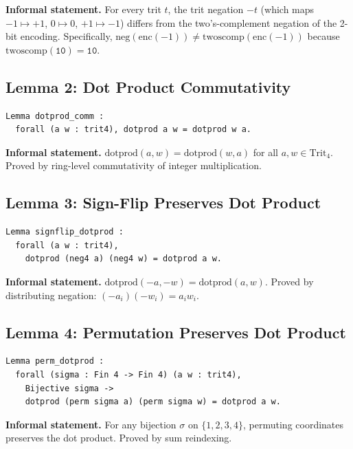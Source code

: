 \noindent\textbf{Informal statement.} For every trit \(t\), the trit
negation \(-t\) (which maps \(-1\mapsto+1\), \(0\mapsto 0\),
\(+1\mapsto-1\)) differs from the two's-complement negation of the
2-bit encoding.  Specifically, \(\mathrm{neg}(\mathrm{enc}(-1)) \neq
\mathrm{twoscomp}(\mathrm{enc}(-1))\) because
\(\mathrm{twoscomp}(\mathtt{10}) = \mathtt{10}\).

\subsection{Lemma 2: Dot Product Commutativity}
\label{lem:dotprod_comm}

\begin{verbatim}
Lemma dotprod_comm :
  forall (a w : trit4), dotprod a w = dotprod w a.
\end{verbatim}

\noindent\textbf{Informal statement.}
\(\mathrm{dotprod}(a,w) = \mathrm{dotprod}(w,a)\) for all
\(a,w \in \mathrm{Trit}_4\).  Proved by ring-level commutativity of
integer multiplication.

\subsection{Lemma 3: Sign-Flip Preserves Dot Product}
\label{lem:signflip_dotprod}

\begin{verbatim}
Lemma signflip_dotprod :
  forall (a w : trit4),
    dotprod (neg4 a) (neg4 w) = dotprod a w.
\end{verbatim}

\noindent\textbf{Informal statement.}
\(\mathrm{dotprod}(-a,-w) = \mathrm{dotprod}(a,w)\).  Proved by
distributing negation: \((-a_i)(-w_i) = a_i w_i\).

\subsection{Lemma 4: Permutation Preserves Dot Product}
\label{lem:perm_dotprod}

\begin{verbatim}
Lemma perm_dotprod :
  forall (sigma : Fin 4 -> Fin 4) (a w : trit4),
    Bijective sigma ->
    dotprod (perm sigma a) (perm sigma w) = dotprod a w.
\end{verbatim}

\noindent\textbf{Informal statement.}
For any bijection \(\sigma\) on \(\{1,2,3,4\}\), permuting coordinates
preserves the dot product.  Proved by sum reindexing.

